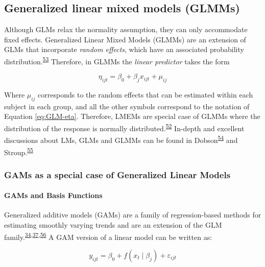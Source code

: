 \documentclass[
]{article}
\begin{document}
\hypertarget{generalized-linear-mixed-models-glmms}{%
\subsection{Generalized linear mixed models (GLMMs)}\label{generalized-linear-mixed-models-glmms}}

Although GLMs relax the normality assumption, they can only accommodate fixed effects. Generalized Linear Mixed Models (GLMMs) are an extension of GLMs that incorporate \emph{random effects}, which have an associated probability distribution.\textsuperscript{\protect\hyperlink{ref-mcculloch2001}{53}} Therefore, in GLMMs the \emph{linear predictor} takes the form

\begin{equation}
\eta_{ijt}=\beta_0+\beta_{j}x_{ijt}+\mu_{ij}
\label{eq:GLMM-eta}
\end{equation}

Where \(\mu_{ij}\) corresponds to the random effects that can be estimated within each subject in each group, and all the other symbols correspond to the notation of Equation \eqref{eq:GLM-eta}. Therefore, LMEMs are special case of GLMMs where the distribution of the response is normally distributed.\textsuperscript{\protect\hyperlink{ref-nelder1972}{52}} In-depth and excellent discussions about LMs, GLMs and GLMMs can be found in Dobson\textsuperscript{\protect\hyperlink{ref-dobson2008}{54}} and Stroup.\textsuperscript{\protect\hyperlink{ref-stroup2013}{55}}

\hypertarget{GAM-theory}{%
\subsubsection{GAMs as a special case of Generalized Linear Models}\label{GAM-theory}}

\hypertarget{gams-and-basis-functions}{%
\paragraph{GAMs and Basis Functions}\label{gams-and-basis-functions}}

Generalized additive models (GAMs) are a family of regression-based methods for estimating smoothly varying trends and are an extension of the GLM family.\textsuperscript{\protect\hyperlink{ref-simpson2018}{34},\protect\hyperlink{ref-wood2017}{37},\protect\hyperlink{ref-hastie1987}{56}} A GAM version of a linear model can be written as:

\begin{equation}
  y_{ijt}=\beta_0+f(x_t\mid \beta_j)+\varepsilon_{ijt}
  \label{eq:GAM}
\end{equation}
\end{document}
